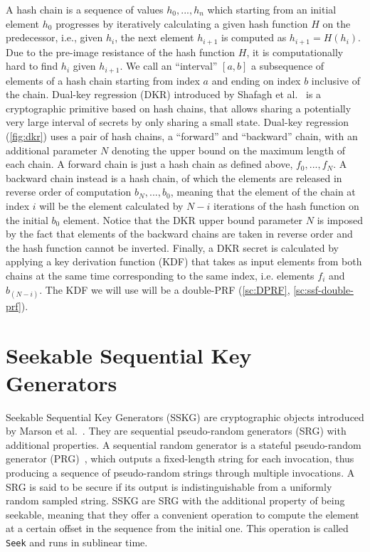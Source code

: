 A hash chain is a sequence of values
$h_{0}, ..., h_{n}$ which starting from an initial
element $h_0$ progresses by iteratively calculating
a given hash function $H$ on the predecessor,
i.e., given $h_i$, the next element $h_{i+1}$ is computed as $h_{i+1} = H(h_i)$.
Due to the pre-image resistance of the hash function $H$, 
it is computationally hard to find $h_i$ given $h_{i+1}$.
We call an ``interval'' $[a, b]$ a subsequence of elements
of a hash chain starting from index $a$ and ending
on index $b$ inclusive of the chain.
Dual-key regression (DKR) introduced by Shafagh et al.~\cite{USENIX:SBRH20} is a
cryptographic primitive based on hash chains, that
allows sharing a potentially very large interval 
of secrets by only sharing a small state.
Dual-key regression (\cref{fig:dkr}) uses a pair of hash chains,
a ``forward'' and ``backward'' chain, with an additional
parameter $N$ denoting the
upper bound on the maximum length of each chain.
A forward chain is just a hash chain as defined
above, $f_{0}, ..., f_{N}$.
A backward chain instead is a hash chain, of which the
elements are released in reverse order of computation
$b_{N}, ..., b_{0}$, meaning that the element of the chain 
at index $i$ will be the element calculated by $N - i$
iterations of the hash function on the initial $b_{0}$
element. Notice that the DKR upper bound parameter
$N$ is imposed by the fact that elements of the backward chains are taken in
reverse order and the hash function cannot be inverted.
Finally, a DKR secret is calculated by applying
a key derivation function (KDF) that takes as input elements from both chains at the same time corresponding to the same index, i.e.\!
elements $f_{i}$ and $b_{(N - i)}$.
The KDF we will use will be a double-PRF (\cref{sc:DPRF}, \cref{sc:ssf-double-prf}).


\section{Seekable Sequential Key Generators}\label{sc:SSKG}

Seekable Sequential Key Generators (SSKG) are cryptographic objects introduced by Marson et al.~\cite{ESORICS:MarPoe13}.
They are sequential pseudo-random generators (SRG) with additional properties.
A sequential random generator is a stateful pseudo-random generator (PRG)~\cite{cryptoeprint:2017/208}, 
which outputs a fixed-length string for each invocation, 
thus producing a sequence of pseudo-random strings through multiple invocations.
A SRG is said to be secure if its output is indistinguishable from a uniformly random sampled string.
SSKG are SRG with the additional property of being seekable,
meaning that they offer a convenient operation to compute the
element at a certain offset in the sequence from the initial one.
This operation is called \texttt{Seek} and runs in sublinear time.

